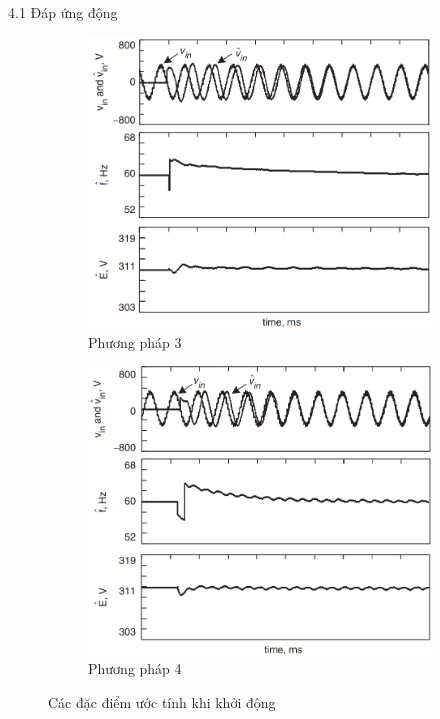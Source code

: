 \documentclass[11pt]{beamer}
\begin{document}
\begin{frame}[t]{4.1 Đáp ứng động}
	\begin{figure}
		\ContinuedFloat
		\begin{subfigure}{0.5\textwidth}
			\includegraphics[width=\linewidth]{fig12c}
			\caption{Phương pháp 3}
		\end{subfigure}%
		\begin{subfigure}{0.5\textwidth}
			\includegraphics[width=\linewidth]{fig12d}
			\caption{Phương pháp 4}
		\end{subfigure}
		\caption{Các đặc điểm ước tính khi khởi động}
	\end{figure}	
	
\end{frame}
\end{document}

